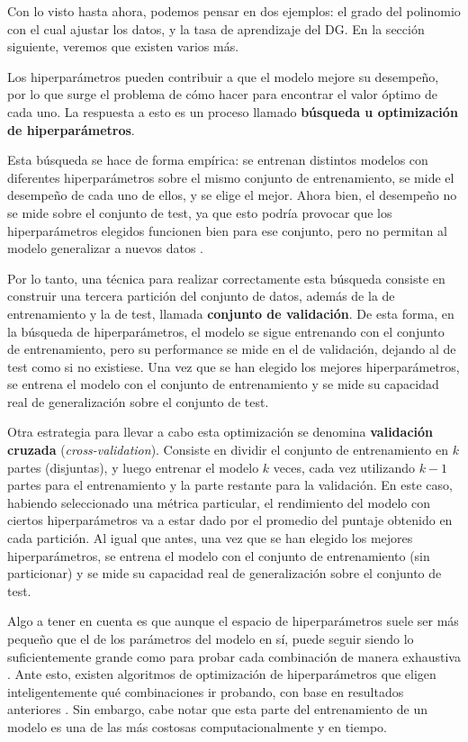 \documentclass[../../main.tex]{subfiles}
\begin{document}
Con lo visto hasta ahora, podemos pensar en dos ejemplos: el grado del polinomio con el
cual ajustar los datos, y la tasa de aprendizaje del DG. En la sección siguiente, veremos
que existen varios más.

Los hiperparámetros pueden contribuir a que el modelo mejore su desempeño, por lo que
surge el problema de cómo hacer para encontrar el valor óptimo de cada uno. La respuesta a
esto es un proceso llamado \textbf{búsqueda u optimización de hiperparámetros}.

Esta búsqueda se hace de forma empírica: se entrenan distintos modelos con diferentes
hiperparámetros sobre el mismo conjunto de entrenamiento, se mide el desempeño de cada
uno de ellos, y se elige el mejor. Ahora bien, el desempeño no se mide sobre el
conjunto de test, ya que esto podría provocar que los hiperparámetros elegidos
funcionen bien para ese conjunto, pero no permitan al modelo generalizar a nuevos
datos \cite{prince2024understanding}.

Por lo tanto, una técnica para realizar correctamente esta búsqueda consiste en construir
una tercera partición del conjunto de datos, además de la de entrenamiento y la de test,
llamada \textbf{conjunto de validación}. De esta forma, en la búsqueda de hiperparámetros,
el modelo se sigue entrenando con el conjunto de entrenamiento, pero su performance se
mide en el de validación, dejando al de test como si no existiese. Una vez que se han
elegido los mejores hiperparámetros, se entrena el modelo con el conjunto de entrenamiento
y se mide su capacidad real de generalización sobre el conjunto de test.

Otra estrategia para llevar a cabo esta optimización se denomina \textbf{validación
cruzada} (\textit{cross-validation}). Consiste en dividir el conjunto de entrenamiento en
\(k\) partes (disjuntas), y luego entrenar el modelo \(k\) veces, cada vez utilizando
\(k-1\) partes para el entrenamiento y la parte restante para la validación. En este caso,
habiendo seleccionado una métrica particular, el rendimiento del modelo con ciertos
hiperparámetros va a estar dado por el promedio del puntaje obtenido en cada partición. Al
igual que antes, una vez que se han elegido los mejores hiperparámetros, se entrena el
modelo con el conjunto de entrenamiento (sin particionar) y se mide su capacidad real de
generalización sobre el conjunto de test.

Algo a tener en cuenta es que aunque el espacio de hiperparámetros suele ser más pequeño
que el de los parámetros del modelo en sí, puede seguir siendo lo suficientemente grande
como para probar cada combinación de manera exhaustiva \cite{prince2024understanding}.
Ante esto, existen algoritmos de optimización de hiperparámetros que eligen
inteligentemente qué combinaciones ir probando, con base en resultados anteriores
\cite{prince2024understanding}. Sin embargo, cabe notar que esta parte del entrenamiento
de un modelo es una de las más costosas computacionalmente y en tiempo.
\end{document}
